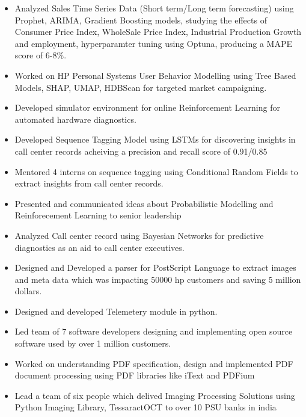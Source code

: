 \documentclass[10pt,a4paper,ragged2e,withhyper]{altacv}
\begin{document}
\begin{paracol}{1}
\par\divider
{}

\begin{itemize}
\item Analyzed Sales Time Series Data (Short term/Long term forecasting) using
Prophet, ARIMA, Gradient Boosting models, studying the effects of Consumer
Price Index, WholeSale Price Index, Industrial Production Growth and
employment, hyperparamter tuning using Optuna, producing a MAPE score of 6-8\%.
\item Worked on HP Personal Systems User Behavior Modelling using Tree Based Models,
SHAP, UMAP, HDBScan for targeted market campaigning.
\item Developed simulator environment for online Reinforcement Learning for
automated hardware diagnostics.
\item Developed Sequence Tagging Model using LSTMs for discovering insights in
call center records acheiving a precision and recall score of 0.91/0.85
\item Mentored 4 interns on sequence tagging using Conditional Random Fields to
extract insights from call center records.
\item Presented and communicated ideas about Probabilistic Modelling and
Reinforecement Learning to senior leadership
\item Analyzed Call center record using Bayesian Networks for predictive diagnostics
as an aid to call center executives.
\end{itemize}


\newpage
\par\divider
{}
\begin{itemize}
\item Designed and Developed a parser for PostScript Language to extract images and
meta data which was impacting 50000 hp customers and saving 5 million dollars.
\item Designed and developed Telemetery module in python.
\item Led team of 7 software developers designing and implementing open source
software used by over 1 million customers.
\item Worked on understanding PDF specification, design and implemented PDF document
processing using PDF libraries like iText and PDFium
\item Lead a team of six people which delived Imaging Processing Solutions using
Python Imaging Library, TessaractOCT to over 10 PSU banks in india
\end{itemize}


\end{paracol}
\end{document}
